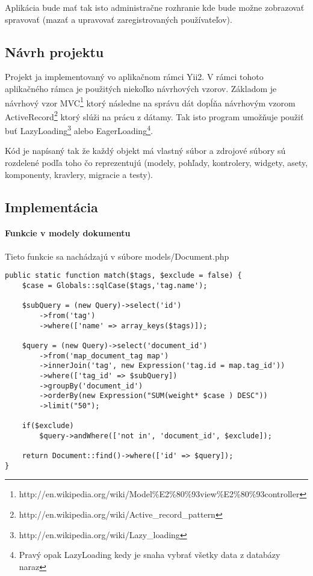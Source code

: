 Aplikácia bude mať tak isto administračne rozhranie kde bude možne zobrazovať
spravovať (mazať a upravovať zaregistrovaných používateľov).

\subsection{Návrh projektu}

Projekt ja implementovaný vo aplikačnom rámci Yii2. V rámci tohoto aplikačného rámca 
je použitých niekoľko návrhových vzorov. Základom je návrhový vzor
MVC\footnote{http://en.wikipedia.org/wiki/Model\%E2\%80\%93view\%E2\%80\%93controller} 
ktorý následne na správu dát dopĺňa návrhovým vzorom
ActiveRecord\footnote{http://en.wikipedia.org/wiki/Active\_record\_pattern} ktorý
slúži na prácu z dátamy. Tak isto program umožňuje použiť buť LazyLoading\footnote{http://en.wikipedia.org/wiki/Lazy\_loading} alebo 
EagerLoading\footnote{Pravý opak LazyLoading kedy je snaha vybrať všetky data z databázy naraz}.

Kód je napísaný tak že každý objekt má vlastný súbor a zdrojové súbory sú rozdelené podľa
toho čo reprezentujú (modely, pohľady, kontrolery, widgety, asety, komponenty, kravlery,
migracie a testy).

\subsection{Implementácia}

\paragraph{Funkcie v modely dokumentu}

Tieto funkcie sa nachádzajú v súbore models/Document.php

\begin{lstlisting}[code=php,
caption=Funkdiac na porovnanie dokumentu zo sadou ováhovaných značie]
public static function match($tags, $exclude = false) {
    $case = Globals::sqlCase($tags,'tag.name');

    $subQuery = (new Query)->select('id')
        ->from('tag')
        ->where(['name' => array_keys($tags)]);

    $query = (new Query)->select('document_id')
        ->from('map_document_tag map')
        ->innerJoin('tag', new Expression('tag.id = map.tag_id'))
        ->where(['tag_id' => $subQuery])
        ->groupBy('document_id')
        ->orderBy(new Expression("SUM(weight* $case ) DESC"))
        ->limit("50");

    if($exclude)
        $query->andWhere(['not in', 'document_id', $exclude]);

    return Document::find()->where(['id' => $query]);
}
\end{lstlisting}

